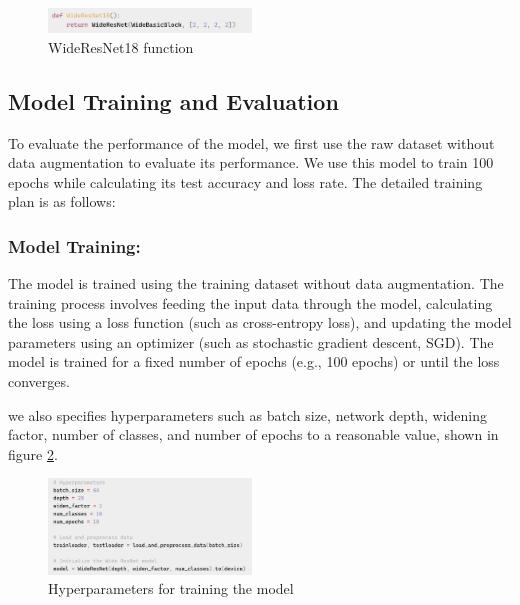 \documentclass[twocolumn]{article}
\begin{document}
    \begin{figure}[ht]
        \centering
        \includegraphics[width=0.48\textwidth]{wide_resnet18.png}
        \caption{WideResNet18 function}
        \label{fig:wide_resnet18}
    \end{figure}

    \subsection{Model Training and Evaluation}
    To evaluate the performance of the model, we first use the raw dataset without data augmentation to evaluate its performance. We use this model to train 100 epochs while calculating its test accuracy and loss rate. The detailed training plan is as follows:

    \subsubsection{Model Training:}
        
        The model is trained using the training dataset without data augmentation. The training process involves feeding the input data through the model, calculating the loss using a loss function (such as cross-entropy loss), and updating the model parameters using an optimizer (such as stochastic gradient descent, SGD). The model is trained for a fixed number of epochs (e.g., 100 epochs) or until the loss converges.
        
        we also specifies hyperparameters such as batch size, network depth, widening factor, number of classes, and number of epochs to a reasonable value, shown in figure \ref{fig:hyperparameter2}.

        \begin{figure}[ht]
            \centering
            \includegraphics[width=0.48\textwidth]{hyperparameter2.png}
            \caption{Hyperparameters for training the model}
            \label{fig:hyperparameter2}
        \end{figure}
\end{document}
